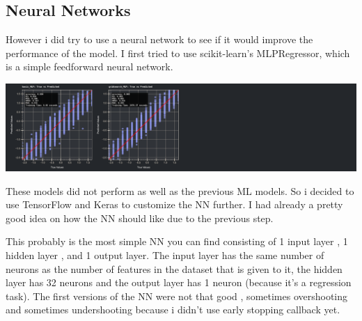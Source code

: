 \documentclass{assignment}
\begin{document}
\subsection{Neural Networks}
However i did try to use a neural network to see if it would improve the performance of the model.
I first tried to use scikit-learn's MLPRegressor, which is a simple feedforward neural network.  
 
\begin{center}
    \includegraphics[width=6.5in,trim={0 0 25cm 0},clip]{../report/assets/nn1_best_models_result.pdf}    
\end{center}
These models did not perform as well as the previous ML models.
So i decided to use TensorFlow and Keras to customize the NN further.
I had already a pretty good idea on how the NN should like due to the previous step.

This probably is the most simple NN you can find consisting of 1 input layer , 1 hidden layer , and 1 output layer.
The input layer has the same number of neurons as the number of features in the dataset that is given to it, the hidden layer has 32 neurons and the output layer has 1 neuron (because it's a regression task).
The first versions of the NN were not that good , sometimes overshooting and sometimes undershooting because i didn't use early stopping callback yet.
\end{document}

